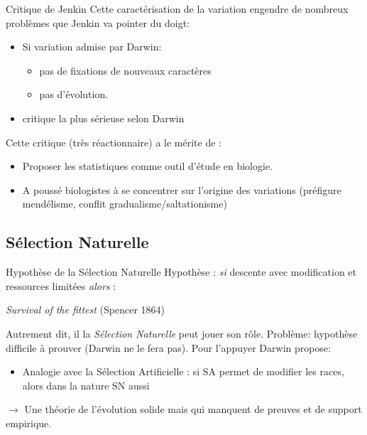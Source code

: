 \documentclass[8pt]{beamer}
\begin{document}
\begin{frame}{Critique de Jenkin}
	Cette caractérisation de la variation engendre de nombreux problèmes que Jenkin va pointer du doigt:
	\begin{beamerboxesrounded}{}
		\begin{itemize}
			\item Si variation admise par Darwin: 
				\begin{itemize}
					\item pas de fixations de nouveaux caractères
					\item pas d'évolution.
				\end{itemize}
			\item critique la plus sérieuse selon Darwin
		\end{itemize}
	\end{beamerboxesrounded}
	\vfill
	Cette critique (très réactionnaire) a le mérite de :
	\begin{itemize}
		\item Proposer les statistiques comme outil d'étude en biologie.
		\item A poussé biologistes à se concentrer sur l'origine des variations (préfigure mendélisme, conflit gradualisme/saltationisme)
	\end{itemize}

\end{frame}


\subsection{Sélection Naturelle}

\begin{frame}{Hypothèse de la Sélection Naturelle}
	Hypothèse : \emph{si} descente avec modification et ressources limitées \emph{alors} :

	\begin{center}
		\emph{Survival of the fittest} (Spencer 1864)
	\end{center}

	Autrement dit, il la \emph{Sélection Naturelle} peut jouer son rôle.
	\vfill
	Problème: hypothèse difficile à prouver (Darwin ne le fera pas).
	\vfil
	Pour l'appuyer Darwin propose:
	\begin{itemize}
		\item Analogie avec la Sélection Artificielle : si SA permet de modifier les races, alors dans la nature SN aussi
	\end{itemize}

	\vfill


	$\rightarrow$ Une théorie de l'évolution solide mais qui manquent de preuves et de support empirique.
\end{frame}
\end{document}
